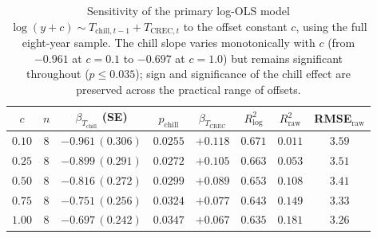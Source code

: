 \begin{table}[H]
\caption{Sensitivity of the primary log-OLS model
$\log(y+c)\sim T_{\text{chill},t-1}+T_{\text{CREC},t}$ to the offset
constant $c$, using the full eight-year sample. The chill slope varies
monotonically with $c$ (from $-0.961$ at $c=0.1$ to $-0.697$ at $c=1.0$)
but remains significant throughout ($p\leq 0.035$); sign and significance
of the chill effect are preserved across the practical range of
offsets.\label{tab:sens_offset}}
\centering
\footnotesize
\begin{tabular}{cccccccc}
\toprule
\textbf{$c$} & \textbf{$n$} & \textbf{$\beta_{T_{\text{chill}}}$ (SE)} & \textbf{$p_{\text{chill}}$} & \textbf{$\beta_{T_{\text{CREC}}}$} & \textbf{$R^{2}_{\log}$} & \textbf{$R^{2}_{\text{raw}}$} & \textbf{RMSE$_{\text{raw}}$} \\
\midrule
$0.10$ & 8 & $-0.961\,(0.306)$ & $0.0255$ & $+0.118$ & $0.671$ & $0.011$ & $3.59$ \\
$0.25$ & 8 & $-0.899\,(0.291)$ & $0.0272$ & $+0.105$ & $0.663$ & $0.053$ & $3.51$ \\
$0.50$ & 8 & $-0.816\,(0.272)$ & $0.0299$ & $+0.089$ & $0.653$ & $0.108$ & $3.41$ \\
$0.75$ & 8 & $-0.751\,(0.256)$ & $0.0324$ & $+0.077$ & $0.643$ & $0.149$ & $3.33$ \\
$1.00$ & 8 & $-0.697\,(0.242)$ & $0.0347$ & $+0.067$ & $0.635$ & $0.181$ & $3.26$ \\
\bottomrule
\end{tabular}
\end{table}
